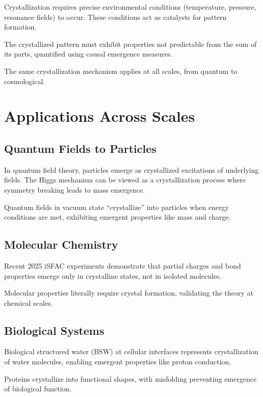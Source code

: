 \documentclass[12pt,oneside]{memoir}
\theoremstyle{plain}
\theoremstyle{definition}
\theoremstyle{remark}
\begin{document}
Crystallization requires precise environmental conditions (temperature, pressure, resonance fields) to occur. These conditions act as catalysts for pattern formation.

The crystallized pattern must exhibit properties not predictable from the sum of its parts, quantified using causal emergence measures.

The same crystallization mechanism applies at all scales, from quantum to cosmological.

\chapter{Applications Across Scales}

\section{Quantum Fields to Particles}

In quantum field theory, particles emerge as crystallized excitations of underlying fields. The Higgs mechanism can be viewed as a crystallization process where symmetry breaking leads to mass emergence.

Quantum fields in vacuum state ``crystallize'' into particles when energy conditions are met, exhibiting emergent properties like mass and charge.

\section{Molecular Chemistry}

Recent 2025 iSFAC experiments demonstrate that partial charges and bond properties emerge only in crystalline states, not in isolated molecules.

Molecular properties literally require crystal formation, validating the theory at chemical scales.

\section{Biological Systems}

Biological structured water (BSW) at cellular interfaces represents crystallization of water molecules, enabling emergent properties like proton conduction.

Proteins crystallize into functional shapes, with misfolding preventing emergence of biological function.
\end{document}
